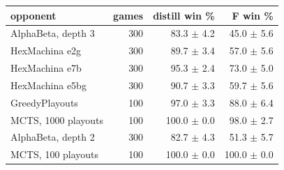 \begin{tabular}{lrrr}
\toprule
opponent & games & distill win \% & F win \% \\
\midrule
AlphaBeta, depth 3 & 300 & 83.3 $\pm$ 4.2 & 45.0 $\pm$ 5.6 \\
HexMachina e2g & 300 & 89.7 $\pm$ 3.4 & 57.0 $\pm$ 5.6 \\
HexMachina e7b & 300 & 95.3 $\pm$ 2.4 & 73.0 $\pm$ 5.0 \\
HexMachina e5bg & 300 & 90.7 $\pm$ 3.3 & 59.7 $\pm$ 5.6 \\
GreedyPlayouts & 100 & 97.0 $\pm$ 3.3 & 88.0 $\pm$ 6.4 \\
MCTS, 1000 playouts & 100 & 100.0 $\pm$ 0.0 & 98.0 $\pm$ 2.7 \\
AlphaBeta, depth 2 & 300 & 82.7 $\pm$ 4.3 & 51.3 $\pm$ 5.7 \\
MCTS, 100 playouts & 100 & 100.0 $\pm$ 0.0 & 100.0 $\pm$ 0.0 \\
\bottomrule
\end{tabular}
